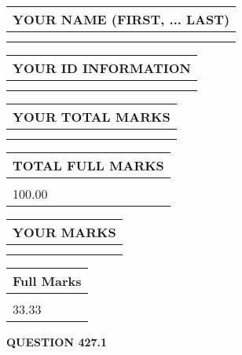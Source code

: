 \documentclass{ctexart}
\begin{document}
   
   
   
\newpage 
\setcounter{page}{ 
   427001 } 
   
   
   
   
\noindent\begin{tabular}{|l|}
\hline
YOUR NAME (FIRST, ... LAST)  \\
\hline
 \\ 
 \\ 
\hline
\end{tabular}
\hspace{0.05in} \begin{tabular}{|l|}
\hline
 YOUR   ID   INFORMATION  \\
\hline
 \\ 
 \\ 
\hline
\end{tabular}
   
   
\vspace{0.2in}\noindent\begin{tabular}{|l|}
\hline
YOUR TOTAL MARKS  \\
\hline
 \\ 
 \\ 
\hline
\end{tabular}
\hspace{0.05in} \begin{tabular}{|l|}
\hline
TOTAL FULL MARKS  \\
\hline
 \\ 
100.00 \\
\hline
\end{tabular}
   
   
 \vspace{0.2in}
 
 
 
 
   
   
  
\vspace{0.2in}
  
\noindent\begin{tabular}{|l|}
\hline
 YOUR MARKS  \\
\hline
 \\ 
 \\ 
\hline
\end{tabular}
\hspace{0.05in} \begin{tabular}{|l|}
\hline
 Full Marks  \\
\hline
 \\ 
33.33 \\
\hline
\end{tabular}
{\textbf{\Large{QUESTION
427.1 
}}}
  
\end{document}
